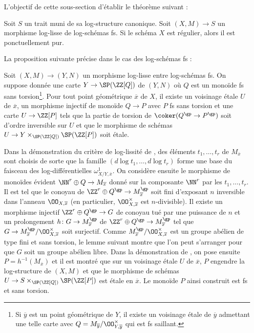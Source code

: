 \documentclass[10pt]{../fichiers-configuration-latex/smfart}
\begin{document}
L'objectif de cette sous-section d'établir le théorème suivant :

\begin{theoreme2}\label{16-theoreme-log-lisse-regulier-implique-p-pur}
Soit $S$ un trait muni de sa log-structure canonique. Soit $(X,M)\to S$  un
morphisme log-lisse de log-schémas fs. Si le schéma $X$ est régulier, alors
il est ponctuellement pur.
\end{theoreme2}

La proposition suivante précise \cite[theorem~3.5]{LSFI@Kato} dans le cas des
log-schémas fs :

\begin{proposition2}\label{16-proposition-critere-log-lissite-fs}
Soit $(X,M)\to (Y,N)$ un morphisme log-lisse entre log-schémas fs. On
suppose donnée une carte $Y\to\SP(\ZZ[Q])$ de $(Y,N)$ où $Q$ est un monoïde
fs sans torsion\;\footnote{Si $\overline y$ est un point géométrique de
$Y$, il existe un voisinage étale de $\overline y$ admettant une telle
carte avec $Q=M_{\overline y}/\OO_{Y,\overline y}^\times$ qui est fs 
saillant.}.
Pour tout point géométrique $\overline x$ de $X$, il
existe un voisinage étale $U$ de $\overline x$, un morphisme injectif de
monoïde $Q\to P$ avec $P$ fs sans torsion et une carte $U\to \ZZ[P]$ tels
que la partie de torsion de $\coker(Q^{\gp}\to P^{\gp})$ soit 
d'ordre inversible sur $U$ et que le morphisme de schémas
$U\to Y\times_{\SP(\ZZ[Q])}\SP(\ZZ[P])$ soit étale.
\end{proposition2}

Dans la démonstration du critère de log-lissité de
\cite[theorem~3.5]{LSFI@Kato}, des éléments $t_1,\dots,t_r$ de $M_{\overline x}$
sont choisis de sorte que la famille 
$(d\log t_1,\dots,d\log t_r)$ forme une base du faisceau des
log-différentielles
$\omega^1_{X/Y,\overline x}$. On considère ensuite le morphisme de monoïdes
évident $\NN^r\oplus Q\to M_{\overline x}$ donné sur la composante $\NN^r$
par les $t_1,\dots,t_r$. Il est tel que le conoyau de $\ZZ^r\oplus
Q^{\gp}\to M_{\overline x}^{\gp}$ soit fini d'exposant $n$ inversible dans
l'anneau $\OO_{X,\overline x}$ (en particulier, $\OO_{X,\overline
x}^\times$ est $n$-divisible). Il existe un
morphisme injectif $\ZZ^r\oplus Q^{\gp}\to G$ de conoyau tué par une
puissance de $n$ et un
prolongement $h\colon G\to M_{\overline x}^{\gp}$
de $\ZZ^r\oplus Q^{\gp}\to M_{\overline x}^{\gp}$
tel que $G\to M_{\overline
x}^{\gp}/\OO^\times_{X,\overline x}$ soit surjectif. Comme $M_{\overline
x}^{\gp}/\OO^\times_{X,\overline x}$ est un groupe abélien de type fini et
sans torsion, le lemme suivant montre que l'on peut s'arranger pour que $G$
soit un groupe abélien libre.
Dans la démonstration de \cite[theorem~3.5]{LSFI@Kato}, on pose ensuite
$P=h^{-1}(M_{\overline x})$ et il est montré que sur un voisinage étale $U$
de $\overline x$, $P$ engendre la log-structure de $(X,M)$ et que
le morphisme
de schémas
$U\to S\times_{\SP(\ZZ[Q])}\SP(\ZZ[P])$ est étale en $\overline x$. Le
monoïde $P$ ainsi construit est fs et sans torsion.
\end{document}
